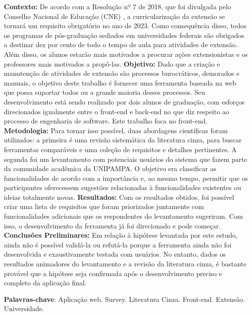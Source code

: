 \begin{resumo}
  \textbf{Contexto:} De acordo com a Resolução nº 7 de 2018, que foi divulgada pelo Conselho Nacional de Educação (CNE) \cite{Resolucao-MEC:2018}, a curricularização da extensão se tornará um requisito obrigatório no ano de 2023. Como consequência disso, todos os programas de pós-graduação sediados em universidades federais são obrigados a destinar dez por cento de todo o tempo de aula para atividades de extensão. Além disso, os alunos estarão mais motivados a procurar ações extensionistas e os professores mais motivados a propô-las. \textbf{Objetivo:} Dado que a criação e manutenção de atividades de extensão são processos burocráticos, demorados e manuais, o objetivo deste trabalho é fornecer uma ferramenta baseada na web que possa suportar todos ou a grande maioria desses processos. Seu desenvolvimento está sendo realizado por dois alunos de graduação, com esforços direcionados igualmente entre o front-end e back-end no que diz respeito ao processo de engenharia de software. Este trabalho foca no front-end. \textbf{Metodologia:} Para tornar isso possível, duas abordagens científicas foram utilizados: a primeira é uma revisão sistemática da literatura cinza, para buscar ferramentas comparáveis e uma coleção de requisitos e detalhes pertinentes. A segunda foi um levantamento com potenciais usuários do sistema que fazem parte da comunidade acadêmica da UNIPAMPA. O objetivo era classificar as funcionalidades de acordo com a importância e, ao mesmo tempo, permitir que os participantes oferecessem sugestões relacionadas à funcionalidades existentes ou ideias totalmente novas. \textbf{Resultados:} Com os resultados obtidos, foi possível criar uma lista de requisitos que foram priorizados juntamente com funcionalidades adicionais que os respondentes do levantamento sugeriram. Com isso, o desenvolvimento da ferramenta já foi direcionado e pode começar. \textbf{Conclusões Preliminares:} Em relação à hipótese levantada por este estudo, ainda não é possível validá-la ou refutá-la porque a ferramenta ainda não foi desenvolvida e exaustivamente testada com usuários. No entanto, dados os resultados animadores do levantamento e a revisão da literatura cinza, é bastante provável que a hipótese seja confirmada após o desenvolvimento preciso e completo da aplicação final.

  \vspace{\onelineskip}

  \noindent
  \textbf{Palavras-chave}: Aplicação web. Survey. Literatura Cinza. Front-end. Extensão. Universidade.
\end{resumo}
